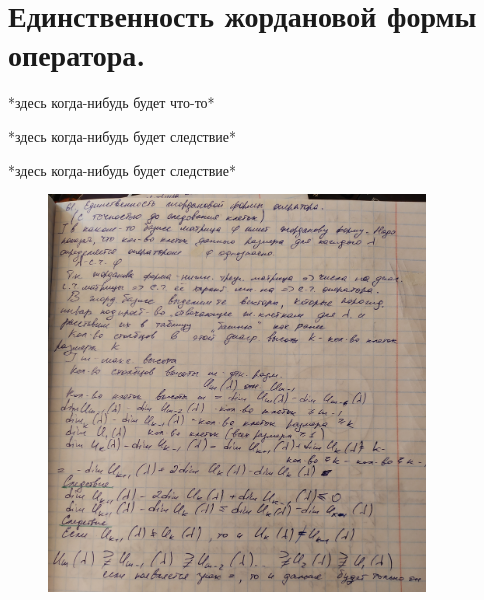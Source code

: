 \documentclass[algebra]{subfiles}
\begin{document}
    \section{Единственность жордановой формы оператора.}

    *здесь когда-нибудь будет что-то*

    \begin{consequence}
      *здесь когда-нибудь будет следствие*
    \end{consequence}

    \begin{consequence}
      *здесь когда-нибудь будет следствие*
    \end{consequence}

    \begin{figure}[H]
            \includegraphics[width=10cm]{pics/l61}
            \centering
    \end{figure}
\end{document}
